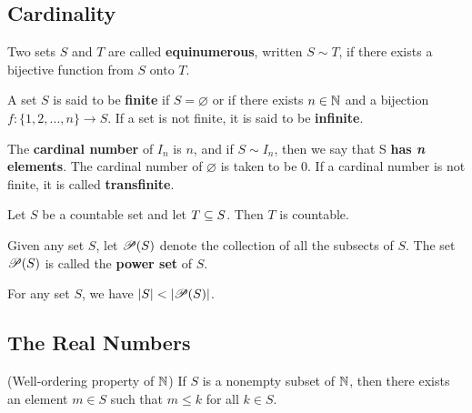 \documentclass[12pt]{article}
\begin{document}
\subsection{Cardinality}
\label{sec:org7c2d47c}
\begin{definition}[Equinumerous]
  Two sets $S$ and $T$ are called \textbf{equinumerous}, written $S \sim T$, if
  there exists a bijective function from $S$ onto $T$.
\end{definition}

\begin{definition}
  A set $S$ is said to be \textbf{finite} if $S = \varnothing$ or if there
  exists $n \in \mathbb{N}$ and a bijection $f : \{ 1, 2, ..., n \} \rightarrow S$. If a set
  is not finite, it is said to be \textbf{infinite}.
\end{definition}

\begin{definition}
  The \textbf{cardinal number} of $I_n$ is $n$, and if $S \sim I_n$, then we say
  that S \textbf{has \textit{n} elements}. The cardinal number of
  $\varnothing$ is taken to be 0. If a cardinal number is not finite, it is
  called \textbf{transfinite}.
\end{definition}

\begin{theorem}
  Let $S$ be a countable set and let $T \subseteq S$. Then $T$ is countable.
\end{theorem}

\begin{definition}
  Given any set $S$, let $\mathscr{P}(S)$ denote the collection of all the subsects
  of $S$. The set $\mathscr{P}(S)$ is called the \textbf{power set} of $S$.
\end{definition}

\begin{theorem}
  For any set $S$, we have $\left|S\right| < \left|\mathscr{P}(S)\right|$.
\end{theorem}

\subsection{The Real Numbers}
\label{sec:org0f369e1}
\begin{axiom}
  (Well-ordering property of $\mathbb{N}$) If $S$ is a nonempty subset of
  $\mathbb{N}$, then there exists an element $m \in S$ such that $m \le k$ for all
  $k \in S$.
\end{axiom}
\end{document}
